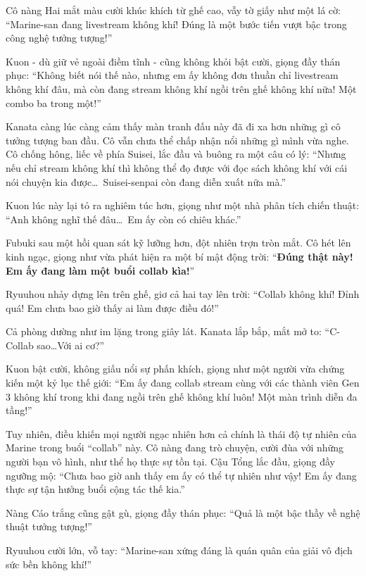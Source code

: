 \documentclass[../main.tex]{subfiles}
\begin{document}
Cô nàng Hai mắt màu cười khúc khích từ ghế cao, vẫy tờ giấy như một lá cờ: ``Marine-san đang livestream không khí! Đúng là một bước tiến vượt bậc trong công nghệ tưởng tượng!''

Kuon - dù giữ vẻ ngoài điềm tĩnh - cũng không khỏi bật cười, giọng đầy thán phục: ``Không biết nói thế nào, nhưng em ấy không đơn thuần chỉ livestream không khí đâu, mà còn đang stream không khí ngồi trên ghế không khí nữa! Một combo ba trong một!''

Kanata càng lúc càng cảm thấy màn tranh đấu này đã đi xa hơn những gì cô tưởng tượng ban đầu. Cô vẫn chưa thể chấp nhận nổi những gì mình vừa nghe. Cô chống hông, liếc về phía Suisei, lắc đầu và buông ra một câu có lý: ``Nhưng nếu chỉ stream không khí thì không thể đọ được với đọc sách không khí với cái nói chuyện kia được\dots\ Suisei-senpai còn đang diễn xuất nữa mà.''

Kuon lúc này lại tỏ ra nghiêm túc hơn, giọng như một nhà phân tích chiến thuật: ``Anh không nghĩ thế đâu\dots\ Em ấy còn có chiêu khác.''

Fubuki sau một hồi quan sát kỹ lưỡng hơn, đột nhiên trợn tròn mắt. Cô hét lên kinh ngạc, giọng như vừa phát hiện ra một bí mật động trời: ``\textbf{Đúng thật này! Em ấy đang làm một buổi collab kìa!}''

Ryuuhou nhảy dựng lên trên ghế, giơ cả hai tay lên trời: ``Collab không khí! Đỉnh quá! Em chưa bao giờ thấy ai làm được điều đó!''

Cả phòng dường như im lặng trong giây lát. Kanata lắp bắp, mắt mở to: ``C-Collab sao\dots Với ai cơ?''

Kuon bật cười, không giấu nổi sự phấn khích, giọng như một người vừa chứng kiến một kỷ lục thế giới: ``Em ấy đang collab stream cùng với các thành viên Gen 3 không khí trong khi đang ngồi trên ghế không khí luôn! Một màn trình diễn đa tầng!''


Tuy nhiên, điều khiến mọi người ngạc nhiên hơn cả chính là thái độ tự nhiên của Marine trong buổi ``collab'' này. Cô nàng đang trò chuyện, cười đùa với những người bạn vô hình, như thể họ thực sự tồn tại. Cậu Tổng lắc đầu, giọng đầy ngưỡng mộ: ``Chưa bao giờ anh thấy em ấy có thể tự nhiên như vậy! Em ấy đang thực sự tận hưởng buổi cộng tác thế kia.''

Nàng Cáo trắng cũng gật gù, giọng đầy thán phục: ``Quả là một bậc thầy về nghệ thuật tưởng tượng!''

Ryuuhou cười lớn, vỗ tay: ``Marine-san xứng đáng là quán quân của giải vô địch sức bền không khí!''
\end{document}

